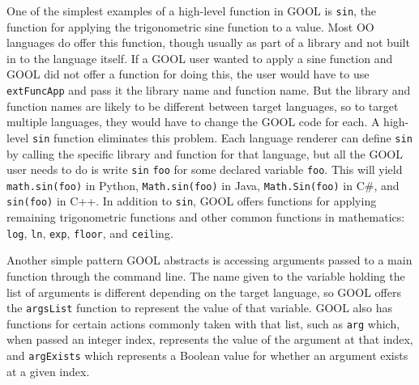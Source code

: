 \documentclass[sigplan,review,anonymous,prologue,dvipsnames]{acmart}
\begin{document}
One of the simplest examples of a high-level function in GOOL is \verb|sin|, 
the function for applying the trigonometric sine function to a value. Most OO 
languages do offer this function, though usually as part of a library and not 
built in to the language itself. If a GOOL user wanted to apply a sine function 
and GOOL did not offer a function for doing this, the user would have to use 
\verb|extFuncApp| and pass it the library name and function name. But the 
library and function names are likely to be different between target languages, 
so to target multiple languages, they would have to change the GOOL 
code for each. A high-level \verb|sin| function eliminates this problem. Each 
language renderer can define \verb|sin| by calling the specific library and 
function for that language, but all the GOOL user needs to do is write 
\verb|sin| \verb|foo| for some declared variable \verb|foo|. This will 
yield \verb|math.sin(foo)| in Python, \verb|Math.sin(foo)| in Java, 
\verb|Math.Sin(foo)| in C\#, and \verb|sin(foo)| in C++. In addition to 
\verb|sin|, GOOL offers functions for applying remaining trigonometric 
functions and other common functions in mathematics: \verb|log|, \verb|ln|, 
\verb|exp|, \verb|floor|, and \verb|ceil|ing.

Another simple pattern GOOL abstracts is accessing arguments passed to a main 
function through the command line. The name given to the variable holding the 
list of arguments is different depending on the target language, so GOOL offers 
the \verb|argsList| function to represent the value of that variable. GOOL 
also has functions for certain actions commonly taken with that list, such as 
\verb|arg| which, when passed an integer index, represents the value of the 
argument at that index, and \verb|argExists| which represents a Boolean value 
for whether an argument exists at a given index.
\end{document}
